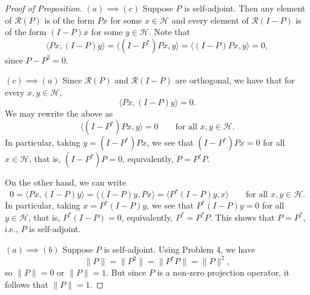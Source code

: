 \documentclass[11pt]{article}
\theoremstyle{thmstyle}
\theoremstyle{defstyle}
\newcommand{\calR}{\mathcal{R}} %
\newcommand{\calH}{\mathcal{H}}
\begin{document}
\begin{proof}[Proof of Proposition]
    $\boxed{(a)\implies(c)}$ Suppose $P$ is self-adjoint. Then any element of $\calR(P)$ is of the form $Px$ for some $x\in\calH$ and every element of $\calR(I - P)$ is of the form $(I - P)x$ for some $y\in\calH$. Note that 
    \begin{equation*}
        \langle Px, (I - P)y\rangle = \langle(I - P^\ast)Px, y\rangle = \langle (I - P)Px, y\rangle = 0,
    \end{equation*}
    since $P - P^2 = 0$.

    $\boxed{(c)\implies(a)}$ Since $\calR(P)$ and $\calR(I - P)$ are orthogonal, we have that for every $x, y\in\calH$, 
    \begin{equation*}
        \langle Px, (I - P)y\rangle = 0.
    \end{equation*}
    We may rewrite the above as 
    \begin{equation*}
        \langle (I - P^\ast)Px, y\rangle = 0\qquad\text{for all }x, y\in\calH.
    \end{equation*}
    In particular, taking $y = (I - P^\ast)Px$, we see that $(I - P^\ast)Px = 0$ for all $x\in\calH$, that is, $(I - P^\ast)P = 0$, equivalently, $P = P^\ast P$.

    On the other hand, we can write 
    \begin{equation*}
        0 = \overline{\langle Px, (I - P)y\rangle} = \langle (I - P)y, Px\rangle = \langle P^\ast(I - P)y, x\rangle\qquad\text{for all } x, y\in\calH.
    \end{equation*}
    In particular, taking $x = P^\ast(I - P)y$, we see that $P^\ast(I - P)y = 0$ for all $y\in\calH$, that is, $P^\ast(I - P) = 0$, equivalently, $P^\ast = P^\ast P$. This shows that $P = P^\ast$, i.e., $P$ is self-adjoint.

    $\boxed{(a)\implies(b)}$ Suppose $P$ is self-adjoint. Using Problem 4, we have 
    \begin{equation*}
        \|P\| = \|P^2\| = \|P^\ast P\| = \|P\|^2,
    \end{equation*}
    so $\|P\| = 0$ or $\|P\| = 1$. But since $P$ is a non-zero projection operator, it follows that $\|P\| = 1$. 


\end{proof}
\end{document}
